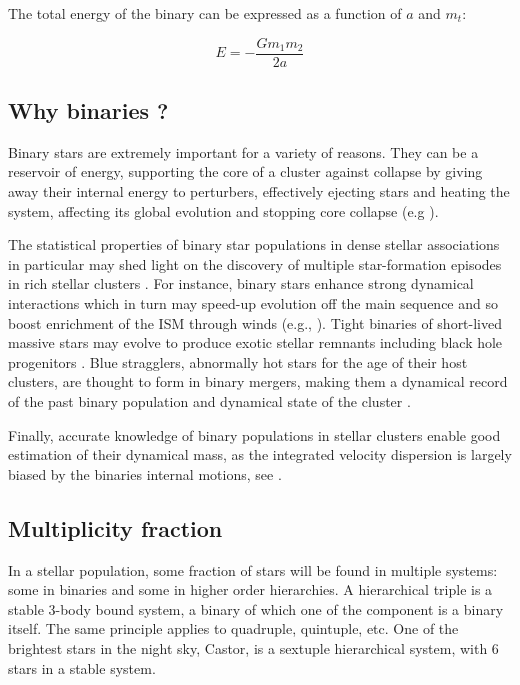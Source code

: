 The total energy of the binary can be expressed as a function of $a$ and $m_t$:

\begin{equation}
E = - \frac{G m_1 m_2}{2a} 
\end{equation}

\subsection{Why binaries ?}

Binary stars are extremely important for a variety of reasons. They can be a reservoir of energy, supporting the core of a cluster against collapse by giving away their internal energy to perturbers, effectively ejecting stars and heating the system, affecting its global evolution and stopping core collapse (e.g \citealt{Heggie1992}).

The statistical properties of binary star populations in dense stellar associations in particular may shed light on the discovery of multiple star-formation episodes in rich stellar clusters \citep{anderson2009}. For instance, binary stars enhance strong dynamical interactions which in turn may speed-up evolution off the main sequence and so boost enrichment of the ISM through winds (e.g., \citealt{Tailo2015}). Tight binaries of short-lived massive stars may evolve to produce exotic stellar remnants including black hole progenitors \citep{bacon1996,davies2009}. Blue stragglers, abnormally hot stars for the age of their host clusters, are thought to form in binary mergers, making them a dynamical record of the past binary population and dynamical state of the cluster \citep{Knigge2009}.

Finally, accurate knowledge of binary populations in stellar clusters enable good estimation of their dynamical mass, as the integrated velocity dispersion is largely biased by the binaries internal motions, see \cite{Rubenstein1997}.

\subsection{Multiplicity fraction}

In a stellar population, some fraction of stars will be found in multiple systems: some  in binaries and some in higher order hierarchies. A hierarchical triple is a stable 3-body bound system, a binary of which one of the component is a binary itself. The same principle applies to quadruple, quintuple, etc. One of the brightest stars in the night sky, Castor, is a sextuple hierarchical system, with 6 stars in a stable system.

